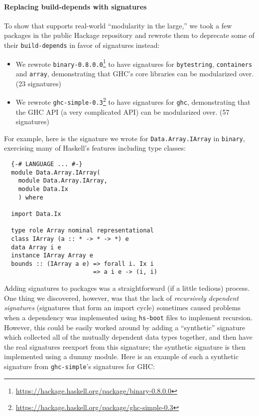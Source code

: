 \paragraph{Replacing build-depends with signatures}  To show that
\Backpack{} supports real-world ``modularity in the large,'' we took a few
packages in the public Hackage repository and rewrote them to deprecate some of
their \verb|build-depends|
in favor of signatures instead:

\begin{itemize}
    \item We rewrote \texttt{binary-0.8.0.0}\footnote{\smaller\url{https://hackage.haskell.org/package/binary-0.8.0.0}}
          to have signatures
          for \texttt{byte\-string}, \texttt{containers} and \texttt{array},
          demonstrating that GHC's core libraries can be modularized
          over. (23 signatures)

    \item We rewrote \texttt{ghc-simple-0.3}\footnote{\smaller\url{https://hackage.haskell.org/package/ghc-simple-0.3}} to have signatures
          for \texttt{ghc}, demonstrating that the GHC API (a very
          complicated API) can be modularized over. (57 signatures)
\end{itemize}

For example, here is the signature we wrote for \texttt{Data.\allowbreak{}Array.\allowbreak{}IArray}
in \texttt{binary}, exercising many of Haskell's features including
type classes:

\begin{verbatim}
  {-# LANGUAGE ... #-}
  module Data.Array.IArray(
    module Data.Array.IArray,
    module Data.Ix
    ) where

  import Data.Ix

  type role Array nominal representational
  class IArray (a :: * -> * -> *) e
  data Array i e
  instance IArray Array e
  bounds :: (IArray a e) => forall i. Ix i
                         => a i e -> (i, i)
\end{verbatim}
%
Adding signatures to packages was a straightforward (if a little tedious)
process.  One thing we discovered, however, was that the lack of
\emph{recursively dependent signatures} \cite{crary+:recmod-pldi}
(\ie signatures that form an import cycle)
sometimes caused problems when a
dependency was implemented using \texttt{hs-boot} files to implement
recursion.  However, this could be easily worked around by adding
a ``synthetic'' signature which collected all of the mutually dependent
data types together, and then have the real signatures reexport
from this signature;  the synthetic signature is then implemented using
a dummy module.  Here is an example of such a synthetic signature
from \texttt{ghc-simple}'s signatures for GHC:

